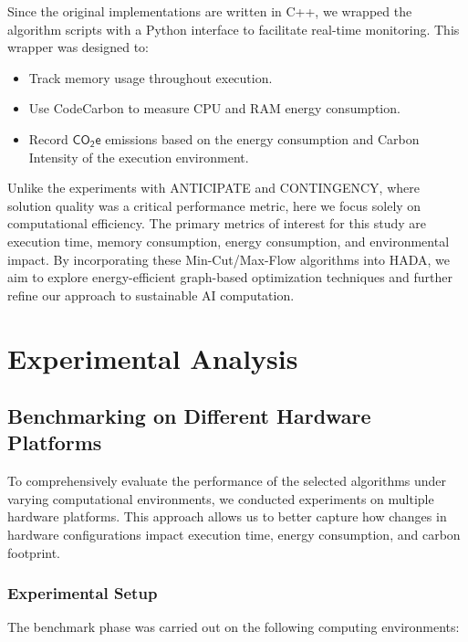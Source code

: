 \documentclass[a4paper,singleside,12pt]{report} %
\begin{document}
Since the original implementations are written in C++, we wrapped the algorithm scripts with a Python interface to facilitate 
real-time monitoring. This wrapper was designed to:
\begin{itemize}
    \item Track memory usage throughout execution.
    \item Use CodeCarbon to measure CPU and RAM energy consumption.
    \item Record $\mathsf{CO_2e}$ emissions based on the energy consumption and Carbon Intensity of the execution environment.
\end{itemize}

Unlike the experiments with ANTICIPATE and CONTINGENCY, where solution quality was a critical performance metric, here we focus 
solely on computational efficiency. The primary metrics of interest for this study are execution time, memory consumption, energy 
consumption, and environmental impact. By incorporating these Min-Cut/Max-Flow algorithms into HADA, we aim to explore 
energy-efficient graph-based optimization techniques and further refine our approach to sustainable AI computation.

\chapter{Experimental Analysis}

\section{Benchmarking on Different Hardware Platforms}

To comprehensively evaluate the performance of the selected algorithms under varying computational environments, we conducted experiments on multiple hardware platforms. This approach allows 
us to better capture how changes in hardware configurations impact execution time, energy consumption, and carbon footprint.

\subsection{Experimental Setup}

The benchmark phase was carried out on the following computing environments:
\end{document}
